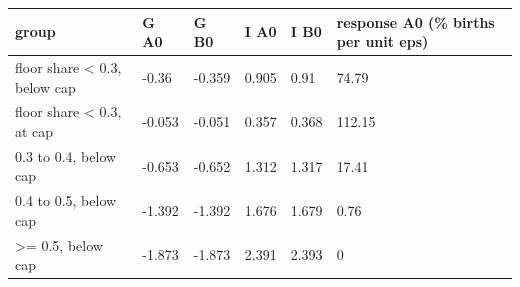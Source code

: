 \begingroup\small
\setlength{\tabcolsep}{3pt}
\renewcommand{\arraystretch}{1.04}
\begin{tabularx}{\linewidth}{XXXXXX}
\toprule
group & G A0 & G B0 & I A0 & I B0 & response A0 (\% births per unit eps) \\
\midrule
floor share \textless{} 0.3, below cap & -0.36 & -0.359 & 0.905 & 0.91 & 74.79 \\
floor share \textless{} 0.3, at cap & -0.053 & -0.051 & 0.357 & 0.368 & 112.15 \\
0.3 to 0.4, below cap & -0.653 & -0.652 & 1.312 & 1.317 & 17.41 \\
0.4 to 0.5, below cap & -1.392 & -1.392 & 1.676 & 1.679 & 0.76 \\
\textgreater{}= 0.5, below cap & -1.873 & -1.873 & 2.391 & 2.393 & 0 \\
\bottomrule
\end{tabularx}
\endgroup
